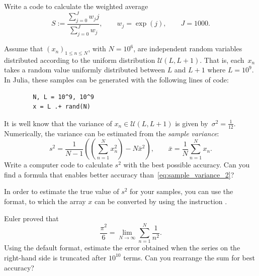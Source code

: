 \begin{exercise}
    Write a code to calculate the weighted average
    \[
        S := \frac
        {\sum_{j=0}^{J} w_j j}
        {\sum_{j=0}^{J} w_j},
        \qquad w_j = \exp(j),
        \qquad J = 1000.
    \]
\end{exercise}

\begin{exercise}
    Assume that $(x_n)_{1 \leq n \leq N}$, with $N = 10^6$, are independent random variables distributed according to
    the uniform distribution $\mathcal U(L, L+1)$.
    That is, each~$x_n$ takes a random value uniformly distributed between $L$ and $L+1$ where $L = 10^9$.
    In Julia, these samples can be generated with the following lines of code:
    \begin{verbatim}
        N, L = 10^9, 10^9
        x = L .+ rand(N)
    \end{verbatim}
    It is well know that the variance of $x_n \in \mathcal U(L, L+1)$ is given by~$\sigma^2 = \frac{1}{12}$.
    Numerically, the variance can be estimated from the \emph{sample variance}:
    \begin{equation}
        \label{eq:sample_variance_2}
        s^2 = \frac{1}{N-1} \left(\left(\sum_{n=1}^{N} x_n^2\right) - N \bar x^2 \right),
        \qquad \bar x = \frac{1}{N} \sum_{n=1}^{N} x_n.
    \end{equation}
    Write a computer code to calculate $s^2$ with the best possible accuracy.
    Can you find a formula that enables better accuracy than~\eqref{eq:sample_variance_2}?
\end{exercise}

\begin{remark}
    In order to estimate the true value of $s^2$ for your samples,
    you can use the  format,
    to which the array $x$ can be converted by using the instruction .
\end{remark}

\begin{exercise}
    Euler proved that
    \[
        \frac{\pi^2}{6} = \lim_{N \to \infty} \sum_{n=1}^{N} \frac{1}{n^2}.
    \]
    Using the default  format,
    estimate the error obtained when the series on the right-hand side is truncated after $10^{10}$ terms.
    Can you rearrange the sum for best accuracy?
\end{exercise}

